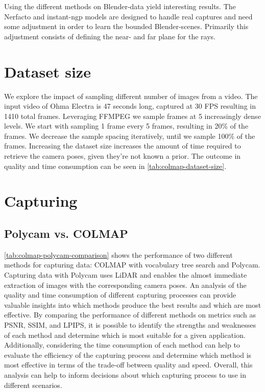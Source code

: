 Using the different methods on Blender-data yield interesting results. The Nerfacto and instant-ngp models are designed to handle real captures and need some adjustment in order to learn the bounded Blender-scenes. Primarily this adjustment consists of defining the near- and far plane for the rays.



\section{Dataset size}
We explore the impact of sampling different number of images from a video. The input video of Ohma Electra \cite{data:object-unbounded-ohma} is 47 seconds long, captured at 30 FPS resulting in 1410 total frames. Leveraging FFMPEG we sample frames at 5 increasingly dense levels. We start with sampling 1 frame every 5 frames, resulting in 20\% of the frames. We decrease the sample spacing iteratively, until we sample 100\% of the frames. Increasing the dataset size increases the amount of time required to retrieve the camera poses, given they're not known a prior. The outcome in quality and time consumption can be seen in \autoref{tab:colmap-dataset-size}.




\section{Capturing}
\subsection{Polycam vs. COLMAP}

\autoref{tab:colmap-polycam-comparison} shows the performance of two different methods for capturing data: COLMAP with vocabulary tree search and Polycam. Capturing data with Polycam uses LiDAR and enables the almost immediate extraction of images with the corresponding camera poses. An analysis of the quality and time consumption of different capturing processes can provide valuable insights into which methods produce the best results and which are most effective. By comparing the performance of different methods on metrics such as PSNR, SSIM, and LPIPS, it is possible to identify the strengths and weaknesses of each method and determine which is most suitable for a given application. Additionally, considering the time consumption of each method can help to evaluate the efficiency of the capturing process and determine which method is most effective in terms of the trade-off between quality and speed. Overall, this analysis can help to inform decisions about which capturing process to use in different scenarios.

